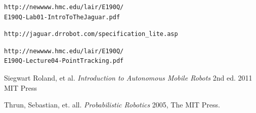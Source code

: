 \documentclass[conference]{IEEEtran}
\begin{document}
\begin{thebibliography}{1}

\begin{verbatim}
http://newwww.hmc.edu/lair/E190Q/
E190Q-Lab01-IntroToTheJaguar.pdf
\end{verbatim}

\begin{verbatim}
http://jaguar.drrobot.com/specification_lite.asp
\end{verbatim}

\begin{verbatim}
http://newwww.hmc.edu/lair/E190Q/
E190Q-Lecture04-PointTracking.pdf
\end{verbatim}

Siegwart Roland, et al. \emph{Introduction to Autonomous Mobile Robots} 2nd ed. 
2011 MIT Press

Thrun, Sebastian, et. all. \emph{Probabilistic Robotics}
2005, The MIT Press.


\end{thebibliography}




\end{document}
